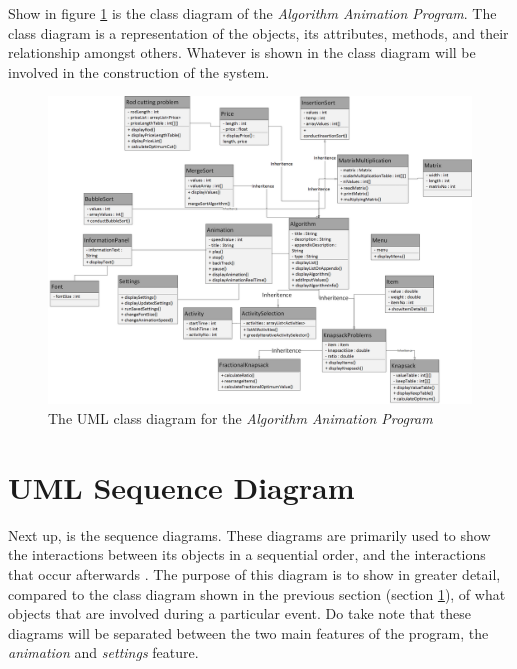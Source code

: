 Show in figure \ref{UMLClassDiagram} is the class diagram of the \textit{Algorithm Animation Program}. The class diagram is a representation of the objects, its attributes, methods, and their relationship amongst others. Whatever is shown in the class diagram will be involved in the construction of the system. 

\begin{landscape}
\begin{figure}[H]
\centering
\includegraphics[scale=.37]{images/report_images/UMLClassDiagram.png}
\caption{The UML class diagram for the \textit{Algorithm Animation Program}}
\label{UMLClassDiagram}
\end{figure}
\end{landscape}

\newpage

\section{UML Sequence Diagram}

Next up, is the sequence diagrams. These diagrams are primarily used to show the interactions between its objects in a sequential order, and the interactions that occur afterwards \cite{UML}. The purpose of this diagram is to show in greater detail, compared to the class diagram shown in the previous section (section \ref{UMLClassDiagram}), of what objects that are involved during a particular event. Do take note that these diagrams will be separated between the two main features of the program, the \textit{animation} and \textit{settings} feature.


